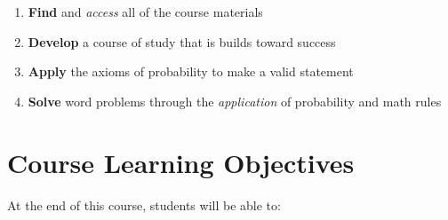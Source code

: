 \documentclass[
]{book}
\providecommand{\tightlist}{%
  \setlength{\itemsep}{0pt}\setlength{\parskip}{0pt}}
\theoremstyle{definition}
\theoremstyle{definition}
\theoremstyle{definition}
\theoremstyle{definition}
\theoremstyle{remark}
\begin{document}
\begin{enumerate}
\def\labelenumi{\arabic{enumi}.}
\tightlist
\item
  \textbf{Find} and \emph{access} all of the course materials
\item
  \textbf{Develop} a course of study that is builds toward success
\item
  \textbf{Apply} the axioms of probability to make a valid statement
\item
  \textbf{Solve} word problems through the \emph{application} of probability and math rules
\end{enumerate}

\hypertarget{course-learning-objectives}{%
\section{Course Learning Objectives}\label{course-learning-objectives}}

At the end of this course, students will be able to:
\end{document}
